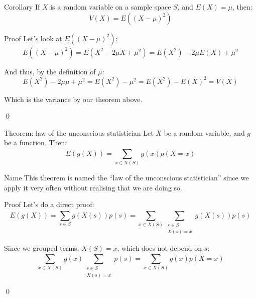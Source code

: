 \documentclass[a4paper]{article}
\begin{document}
\begin{parag}{Corollary}
    If $X$ is a random variable on a sample space $S$, and $E\left(X\right) = \mu$, then: 
    \[V\left(X\right) = E\left(\left(X - \mu\right)^2\right)\]

    \begin{subparag}{Proof}
        Let's look at $E\left(\left(X - \mu\right)^2\right)$: 
        \[E\left(\left(X - \mu\right)^2\right) = E\left(X^2 - 2\mu X + \mu^2\right) = E\left(X^2\right) - 2\mu E\left(X\right) + \mu^2  \]

        And thus, by the definition of $\mu$:
        \[E\left(X^2\right) - 2\mu \mu + \mu^2 = E\left(X^2\right) - \mu^2 = E\left(X^2\right) - E\left(X\right)^2 = V\left(X\right)\]

        Which is the variance by our theorem above.

        \qed
    \end{subparag}
\end{parag}

\begin{parag}{Theorem: law of the unconscious statistician}
    Let $X$ be a random variable, and $g$ be a function. Then: 
    \[E\left(g\left(X\right)\right) = \sum_{x \in X\left(S\right)}^{} g\left(x\right)p\left(X = x\right)\]
    
    \begin{subparag}{Name}
        This theorem is named the ``law of the unconscious statistician'' since we apply it very often without realising that we are doing so. 
    \end{subparag}
    

    \begin{subparag}{Proof}
        Let's do a direct proof:
        \[E\left(g\left(X\right)\right) = \sum_{s \in S}^{} g\left(X\left(s\right)\right) p\left(s\right) = \sum_{x \in X\left(S\right)}^{} \sum_{\substack{s \in S \\ X\left(s\right) = x}}^{} g\left(X\left(s\right)\right)p\left(s\right) \]

        Since we grouped terms, $X\left(S\right) = x$, which does not depend on $s$:
        \[\sum_{x \in X\left(S\right)}^{} g\left(x\right) \sum_{\substack{s \in S \\ X\left(s\right) = x}}^{} p\left(s\right) = \sum_{x \in X\left(S\right)}^{} g\left(x\right) p\left(X = x\right) \]

        \qed
    \end{subparag}
\end{parag}
\end{document}
